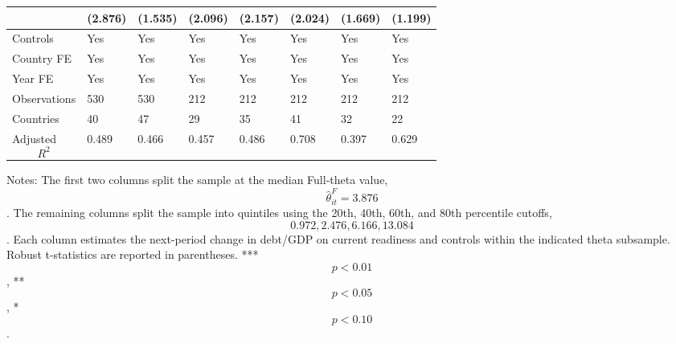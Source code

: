 \begin{table}[H]
\begin{threeparttable}
\begin{tabularx}{\textwidth}{lYYYYYYY}
  & (2.876) & (1.535) & (2.096) & (2.157) & (2.024) & (1.669) & (1.199) \\
\midrule
Controls & Yes & Yes & Yes & Yes & Yes & Yes & Yes \\
Country FE & Yes & Yes & Yes & Yes & Yes & Yes & Yes \\
Year FE & Yes & Yes & Yes & Yes & Yes & Yes & Yes \\
Observations & 530 & 530 & 212 & 212 & 212 & 212 & 212 \\
Countries & 40 & 47 & 29 & 35 & 41 & 32 & 22 \\
Adjusted $$R^2$$ & 0.489 & 0.466 & 0.457 & 0.486 & 0.708 & 0.397 & 0.629 \\
\bottomrule
\end{tabularx}
\begin{tablenotes}[flushleft]\footnotesize
\item Notes: The first two columns split the sample at the median Full-theta value, $$\widehat{\theta}^{F}_{it}=3.876$$. The remaining columns split the sample into quintiles using the 20th, 40th, 60th, and 80th percentile cutoffs, $$0.972, 2.476, 6.166, 13.084$$. Each column estimates the next-period change in debt/GDP on current readiness and controls within the indicated theta subsample. Robust t-statistics are reported in parentheses. *** $$p<0.01$$, ** $$p<0.05$$, * $$p<0.10$$.
\end{tablenotes}
\end{threeparttable}
\end{table}
